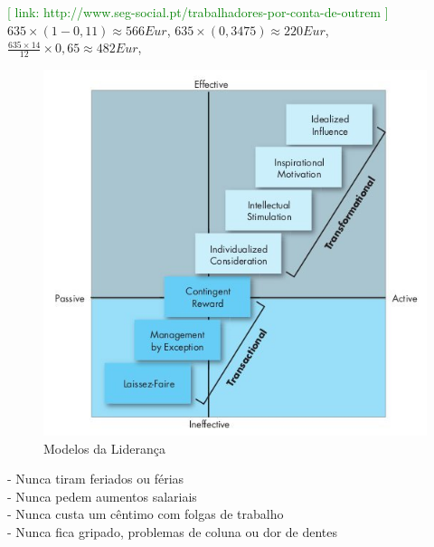 \textcolor{green}{\small [ link: \quad http://www.seg-social.pt/trabalhadores-por-conta-de-outrem ]} \\
\hspace*{.3cm} $635\times(1-0,11)\approx566Eur$,\hspace*{1cm} $635\times(0,3475)\approx220Eur$,\hspace*{1cm} $\frac{635\times14}{12}\times0,65 \approx 482Eur$, \\
\begin{figure}[H]
	\centering
	\includegraphics[scale=0.52]{./image/CORGA/Leadership/Leadership_Models.jpg}
	\caption{Modelos da Liderança \cite{book_2}}
\end{figure}
\hspace*{.5cm} - Nunca tiram feriados ou férias\\
\hspace*{.5cm} - Nunca pedem aumentos salariais\\
\hspace*{.5cm} - Nunca custa um cêntimo com folgas de trabalho\\
\hspace*{.5cm} - Nunca fica gripado, problemas de coluna ou dor de dentes\\
